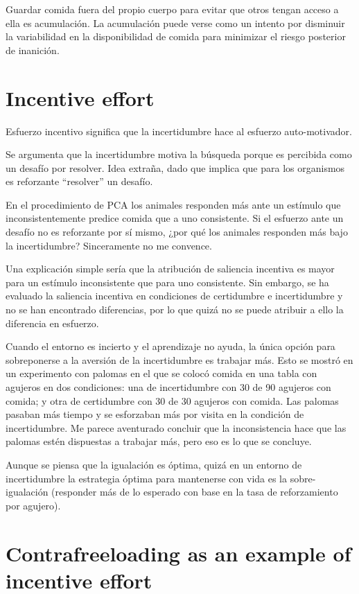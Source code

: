 \documentclass[a4paper,12pt]{article}
\begin{document}
Guardar comida fuera del propio cuerpo para evitar que otros tengan acceso a ella es acumulación.
La acumulación puede verse como un intento por disminuir la variabilidad en la disponibilidad de comida para minimizar el riesgo posterior de inanición.

\section{Incentive effort}

Esfuerzo incentivo significa que la incertidumbre hace al esfuerzo auto-motivador.

Se argumenta que la incertidumbre motiva la búsqueda porque es percibida como un desafío por resolver.
Idea extraña, dado que implica que para los organismos es reforzante ``resolver'' un desafío.

En el procedimiento de PCA los animales responden más ante un estímulo que inconsistentemente predice comida que a uno consistente.
Si el esfuerzo ante un desafío no es reforzante por sí mismo, ¿por qué los animales responden más bajo la incertidumbre? Sinceramente no me convence.

Una explicación simple sería que la atribución de saliencia incentiva es mayor para un estímulo inconsistente que para uno consistente.
Sin embargo, se ha evaluado la saliencia incentiva en condiciones de certidumbre e incertidumbre y no se han encontrado diferencias, por lo que quizá no se puede atribuir a ello la diferencia en esfuerzo.

Cuando el entorno es incierto y el aprendizaje no ayuda, la única opción para sobreponerse a la aversión de la incertidumbre es trabajar más.
Esto se mostró en un experimento con palomas en el que se colocó comida en una tabla con agujeros en dos condiciones: una de incertidumbre con 30 de 90 agujeros con comida; y otra de certidumbre con 30 de 30 agujeros con comida.
Las palomas pasaban más tiempo y se esforzaban más por visita en la condición de incertidumbre.
Me parece aventurado concluir que la inconsistencia hace que las palomas estén dispuestas a trabajar más, pero eso es lo que se concluye.

Aunque se piensa que la igualación es óptima, quizá en un entorno de incertidumbre la estrategia óptima para mantenerse con vida es la sobre-igualación (responder más de lo esperado con base en la tasa de reforzamiento por agujero).

\section{Contrafreeloading as an example of incentive effort}
\end{document}
